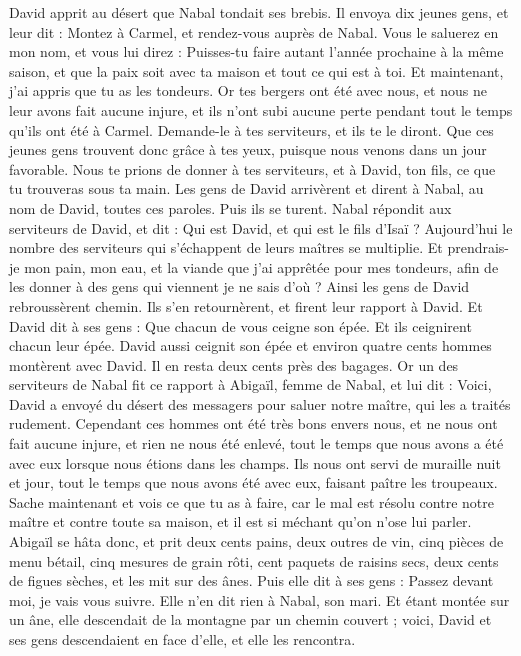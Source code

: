 \begin{multicols}{2}
David apprit au désert que Nabal tondait ses brebis.
Il envoya dix jeunes gens, et leur dit : Montez à Carmel, et rendez-vous auprès de Nabal. Vous le saluerez en mon nom,
et vous lui direz : Puisses-tu faire autant l'année prochaine à la même saison, et que la paix soit avec ta maison et tout ce qui est à toi.
Et maintenant, j'ai appris que tu as les tondeurs. Or tes bergers ont été avec nous, et nous ne leur avons fait aucune injure, et ils n'ont subi aucune perte pendant tout le temps qu'ils ont été à Carmel.
Demande-le à tes serviteurs, et ils te le diront. Que ces jeunes gens trouvent donc grâce à tes yeux, puisque nous venons dans un jour favorable. Nous te prions de donner à tes serviteurs, et à David, ton fils, ce que tu trouveras sous ta main.
Les gens de David arrivèrent et dirent à Nabal, au nom de David, toutes ces paroles. Puis ils se turent.
Nabal répondit aux serviteurs de David, et dit : Qui est David, et qui est le fils d'Isaï ? Aujourd'hui le nombre des serviteurs qui s'échappent de leurs maîtres se multiplie.
Et prendrais-je mon pain, mon eau, et la viande que j'ai apprêtée pour mes tondeurs, afin de les donner à des gens qui viennent je ne sais d'où ?
Ainsi les gens de David rebroussèrent chemin. Ils s'en retournèrent, et firent leur rapport à David.
Et David dit à ses gens : Que chacun de vous ceigne son épée. Et ils ceignirent chacun leur épée. David aussi ceignit son épée et environ quatre cents hommes montèrent avec David. Il en resta deux cents près des bagages.
Or un des serviteurs de Nabal fit ce rapport à Abigaïl, femme de Nabal, et lui dit : Voici, David a envoyé du désert des messagers pour saluer notre maître, qui les a traités rudement.
Cependant ces hommes ont été très bons envers nous, et ne nous ont fait aucune injure, et rien ne nous été enlevé, tout le temps que nous avons a été avec eux lorsque nous étions dans les champs.
Ils nous ont servi de muraille nuit et jour, tout le temps que nous avons été avec eux, faisant paître les troupeaux.
Sache maintenant et vois ce que tu as à faire, car le mal est résolu contre notre maître et contre toute sa maison, et il est si méchant qu'on n'ose lui parler.
Abigaïl se hâta donc, et prit deux cents pains, deux outres de vin, cinq pièces de menu bétail, cinq mesures de grain rôti, cent paquets de raisins secs, deux cents de figues sèches, et les mit sur des ânes.
Puis elle dit à ses gens : Passez devant moi, je vais vous suivre. Elle n'en dit rien à Nabal, son mari.
Et étant montée sur un âne, elle descendait de la montagne par un chemin couvert ; voici, David et ses gens descendaient en face d'elle, et elle les rencontra.

\end{multicols}
